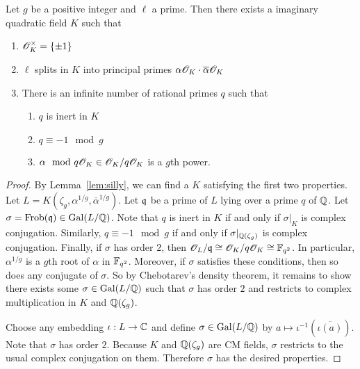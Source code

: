 \documentclass{amsart}
\begin{document}
\begin{lemma}\label{lem:K-exists}
  Let $g$ be a positive integer and $\ell$ a prime. Then there exists a imaginary quadratic field $K$ such that
  \begin{enumerate}
    \item $\mathscr{O}_K^\times = \{\pm 1\}$
    \item $\ell$ splits in $K$ into principal primes $\alpha\mathscr{O}_K \cdot \overline{\alpha}\mathscr{O}_K$
    \item There is an infinite number of rational primes $q$ such that
    \begin{enumerate}
      \item $q$ is inert in $K$
      \item $q \equiv -1 \mod{g}$
      \item $\alpha \mod q\mathscr{O}_K \in \mathscr{O}_K/q\mathscr{O}_K$ is a $g$th power.
    \end{enumerate}
  \end{enumerate}
\end{lemma}
\begin{proof}
  By Lemma~\ref{lem:silly}, we can find a $K$ satisfying the first two properties. Let $L = K(\zeta_g,\alpha^{1/g},\overline{\alpha}^{1/g})$. Let $\frak{q}$ be a prime of $L$ lying over a prime $q$ of $\mathbb{Q}$. Let $\sigma = \mathrm{Frob}(\frak{q}) \in \operatorname{Gal}(L/\mathbb{Q})$. Note that $q$ is inert in $K$ if and only if $\sigma|_K$ is complex conjugation. Similarly, $q \equiv -1 \mod{g}$ if and only if $\sigma|_{\mathbb{Q}(\zeta_g)}$ is complex conjugation.
Finally, if $\sigma$ has order $2$, then $\mathscr{O}_L/\frak{q} \cong \mathscr{O}_K/q\mathscr{O}_K \cong \mathbb{F}_{q^2}$. In particular, $\alpha^{1/g}$ is a $g$th root of $\alpha$ in $\mathbb{F}_{q^2}$. Moreover, if $\sigma$ satisfies these conditions, then so does any conjugate of $\sigma$. So by Chebotarev's density theorem, it remains to show there exists some $\sigma \in \operatorname{Gal}(L/\mathbb{Q})$ such that $\sigma$ has order $2$ and restricts to complex multiplication in $K$ and $\mathbb{Q}(\zeta_g)$.

  Choose any embedding $\iota: L \to \mathbb{C}$ and define $\sigma \in \operatorname{Gal}(L/\mathbb{Q})$ by $a \mapsto \iota^{-1}(\overline{\iota(a)})$. Note that $\sigma$ has order $2$. Because $K$ and $\mathbb{Q}(\zeta_g)$ are CM fields, $\sigma$ restricts to the usual complex conjugation on them. Therefore $\sigma$ has the desired properties.
\end{proof}
\end{document}
